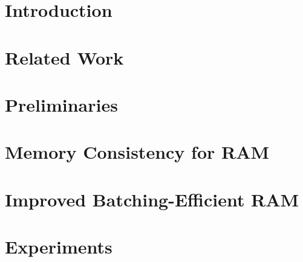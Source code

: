 \documentclass{llncs}
\begin{document}
\section{Introduction}\label{sec:introduction}





\section{Related Work}\label{sec:rel-work}
	

\section{Preliminaries}\label{sec:prelims}
    

	

\section{Memory Consistency for RAM}\label{sec:model-for-ram}


\section{Improved Batching-Efficient RAM}\label{sec:batch-efficient-ram}


\section{Experiments}\label{sec:experiments}




\appendix

\end{document}
